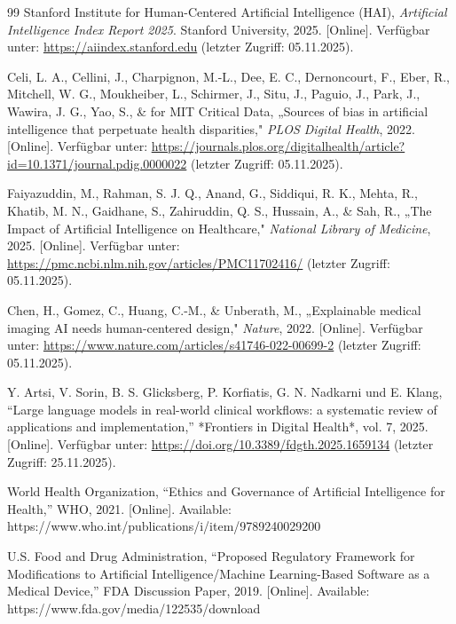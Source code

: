 \documentclass[lettersize,journal]{IEEEtran}
\begin{document}
\begin{thebibliography}{99}
Stanford Institute for Human-Centered Artificial Intelligence (HAI), 
\textit{Artificial Intelligence Index Report 2025}. 
Stanford University, 2025. [Online]. 
Verfügbar unter: \url{https://aiindex.stanford.edu} 
(letzter Zugriff: 05.11.2025).

Celi, L. A., Cellini, J., Charpignon, M.-L., Dee, E. C., Dernoncourt, F., 
Eber, R., Mitchell, W. G., Moukheiber, L., Schirmer, J., Situ, J., 
Paguio, J., Park, J., Wawira, J. G., Yao, S., \& for MIT Critical Data, 
„Sources of bias in artificial intelligence that perpetuate health disparities," 
\textit{PLOS Digital Health}, 2022. [Online]. 
Verfügbar unter: \url{https://journals.plos.org/digitalhealth/article?id=10.1371/journal.pdig.0000022} 
(letzter Zugriff: 05.11.2025).

Faiyazuddin, M., Rahman, S. J. Q., Anand, G., Siddiqui, R. K., Mehta, R., 
Khatib, M. N., Gaidhane, S., Zahiruddin, Q. S., Hussain, A., \& Sah, R., 
„The Impact of Artificial Intelligence on Healthcare," 
\textit{National Library of Medicine}, 2025. [Online]. 
Verfügbar unter: \url{https://pmc.ncbi.nlm.nih.gov/articles/PMC11702416/} 
(letzter Zugriff: 05.11.2025).

Chen, H., Gomez, C., Huang, C.-M., \& Unberath, M., 
„Explainable medical imaging AI needs human-centered design," 
\textit{Nature}, 2022. [Online]. 
Verfügbar unter: \url{https://www.nature.com/articles/s41746-022-00699-2} 
(letzter Zugriff: 05.11.2025).

Y. Artsi, V. Sorin, B. S. Glicksberg, P. Korfiatis, G. N. Nadkarni und E. Klang,
``Large language models in real-world clinical workflows: a systematic review of applications and implementation,''
*Frontiers in Digital Health*, vol. 7, 2025.  
[Online]. Verfügbar unter: \url{https://doi.org/10.3389/fdgth.2025.1659134} (letzter Zugriff: 25.11.2025).

World Health Organization,
``Ethics and Governance of Artificial Intelligence for Health,''
WHO, 2021.
[Online]. Available: https://www.who.int/publications/i/item/9789240029200

U.S. Food and Drug Administration,
``Proposed Regulatory Framework for Modifications to Artificial Intelligence/Machine Learning-Based Software as a Medical Device,''
FDA Discussion Paper, 2019.
[Online]. Available: https://www.fda.gov/media/122535/download


\end{thebibliography}
\end{document}
